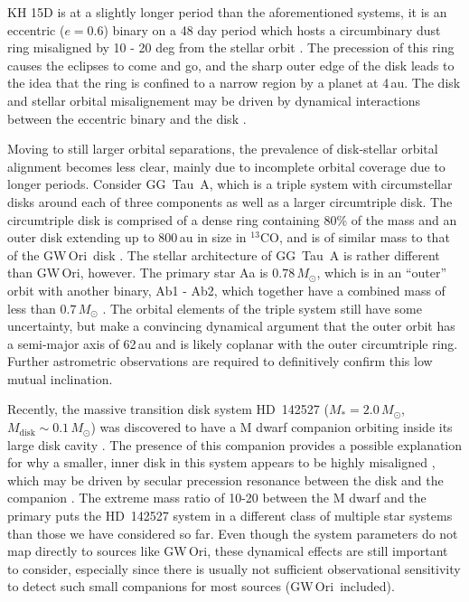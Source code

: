 \documentclass[twocolumn]{aastex61}
\newcommand{\obj}{GW\,Ori}
\newcommand{\thirteen}{${}^{13}$CO}
\begin{document}
KH 15D is at a slightly longer period than the aforementioned systems, it is an eccentric ($e=0.6$) binary on a 48 day period which hosts a circumbinary dust ring misaligned by 10 - 20 deg from the stellar orbit \citep{chiang04,capelo12}. The precession of this ring causes the eclipses to come and go, and the sharp outer edge of the disk leads to the idea that the ring is confined to a narrow region by a planet at 4\,au. The disk and stellar orbital misalignement may be driven by dynamical interactions between the eccentric binary and the disk \citep[e.g.,]{martin17,zanazzi17}.

Moving to still larger orbital separations, the prevalence of disk-stellar orbital alignment becomes less clear, mainly due to incomplete orbital coverage due to longer periods. Consider GG~Tau~A, which is a triple system with circumstellar disks around each of three components as well as a larger circumtriple disk. The circumtriple disk is comprised of a dense ring containing 80\% of the mass and an outer disk extending up to 800\,au in size in \thirteen, and is of similar mass to that of the \obj\ disk \citep[$0.12\,M_\odot$;][]{guilloteau99}. The stellar architecture of GG~Tau~A is rather different than \obj, however. The primary star Aa is $0.78\,M_\odot$, which is in an ``outer'' orbit with another binary, Ab1 - Ab2, which together have a combined mass of less than $0.7\,M_\odot$ \citep{dutrey16}. The orbital elements of the triple system still have some uncertainty, but \citet{nelson16} make a convincing dynamical argument that the outer orbit has a semi-major axis of 62\,au and is likely coplanar with the outer circumtriple ring. Further astrometric observations are required to definitively confirm this low mutual inclination.

Recently, the massive transition disk system HD~142527 ($M_\ast = 2.0\,M_\odot$, $M_\mathrm{disk} \sim 0.1\,M_\odot$) was discovered to have a M dwarf companion orbiting inside its large disk cavity \citep{biller12,lacour16}. The presence of this companion provides a possible explanation for why a smaller, inner disk in this system appears to be highly misaligned \citep[$\sim$70 deg][]{avenhaus14,marino15}, which may be driven by secular precession resonance between the disk and the companion \citep{owen17}. The extreme mass ratio of 10-20 between the M dwarf and the primary puts the HD~142527 system in a different class of multiple star systems than those we have considered so far. Even though the system parameters do not map directly to sources like \obj, these dynamical effects are still important to consider, especially since there is usually not sufficient observational sensitivity to detect such small companions for most sources (\obj\ included).
\end{document}

